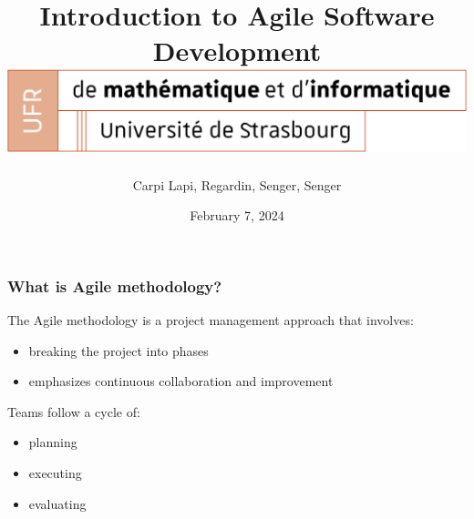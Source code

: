 \documentclass[10pt]{beamer}
\title[Introduction to Agile Software Development]{
  Introduction to Agile Software Development \\
  \vspace{1cm}
  \includegraphics[width=0.9\pdfpagewidth]{logo_Uni.png}
}
\author[SuperAgile]{Carpi Lapi, Regardin, Senger, Senger}
\date[February 7, 2024]{February 7, 2024}
\begin{document}
\frame{\titlepage}

\begin{frame}
\frametitle{What is Agile methodology?}
The Agile methodology is a project management approach that involves:
\begin{itemize}
    \item breaking the project into phases
    \item emphasizes continuous collaboration and improvement \\
    \vspace{1cm}
\end{itemize}

Teams follow a cycle of: 
\begin{itemize}
    \item planning
    \item executing
    \item evaluating
\end{itemize}

\end{frame}

\begin{frame}
    
\end{frame}

\begin{frame}
    
\end{frame}
\end{document}
